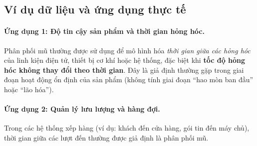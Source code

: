 \subsection{Ví dụ dữ liệu và ứng dụng thực tế}

\paragraph{Ứng dụng 1: Độ tin cậy sản phẩm và thời gian hỏng hóc.}  
Phân phối mũ thường được sử dụng để mô hình hóa \textit{thời gian giữa các hỏng hóc} của linh kiện điện tử, thiết bị cơ khí hoặc hệ thống, đặc biệt khi \textbf{tốc độ hỏng hóc không thay đổi theo thời gian}. Đây là giả định thường gặp trong giai đoạn hoạt động ổn định của sản phẩm (không tính giai đoạn “hao mòn ban đầu” hoặc “lão hóa”).

\paragraph{Ứng dụng 2: Quản lý lưu lượng và hàng đợi.}  
Trong các hệ thống xếp hàng (ví dụ: khách đến cửa hàng, gói tin đến máy chủ), thời gian giữa các lượt đến thường được giả định là phân phối mũ.
